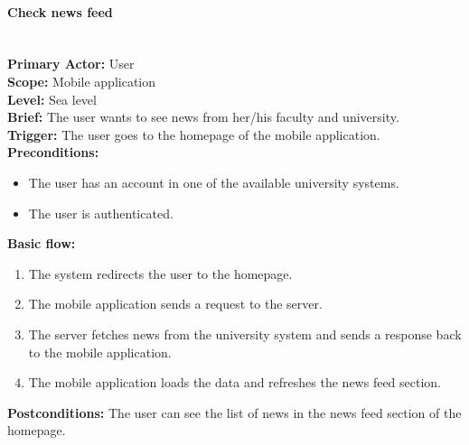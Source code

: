 \paragraph{\large{Check news feed}}\mbox{}\\[2pt]
\textbf{Primary Actor:} User\\
\textbf{Scope:} Mobile application\\
\textbf{Level:} Sea level\\
\textbf{Brief:} The user wants to see news from her/his faculty and university.\\
\textbf{Trigger:} The user goes to the homepage of the mobile application.\\
\textbf{Preconditions:}
\begin{itemize}
    \item The user has an account in one of the available university systems.
    \item The user is authenticated.
\end{itemize}
\textbf{Basic flow:}
\begin{enumerate}
    \item The system redirects the user to the homepage.
    \item The mobile application sends a request to the server.
    \item The server fetches news from the university system and sends a response back to the mobile application.
    \item The mobile application loads the data and refreshes the news feed section.
\end{enumerate}
\textbf{Postconditions:}
The user can see the list of news in the news feed section of the homepage.


